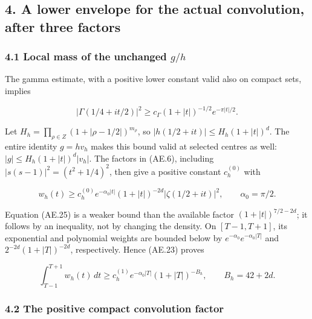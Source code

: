 \subsection*{4. A lower envelope for the actual convolution, after three
factors}
\label{AE.a-lower-envelope-for-the-actual-convolution-after-three-factors}

\subsubsection*{\texorpdfstring{4.1 Local mass of the unchanged
\(g/h\)}{4.1 Local mass of the unchanged g/h}}
\label{AE.local-mass-of-the-unchanged-gh}

The gamma estimate, with a positive lower constant valid also on compact
sets, implies

\[
 |\Gamma(1/4+it/2)|^2
 \ge c_\Gamma(1+|t|)^{-1/2}e^{-\pi|t|/2}.                              \tag{AE.24}\label{AE.eq.24}
\]

Let \(H_h=\prod_{\rho\in Z}(1+|\rho-1/2|)^{m_\rho}\), so
\(|h(1/2+it)|\le H_h(1+|t|)^d\). The entire identity \(g=hv_h\) makes
this bound valid at selected centres as well:
\(|g|\le H_h(1+|t|)^d|v_h|\). The factors in (AE.6), including
\(|s(s-1)|^2=(t^2+1/4)^2\), then give a positive constant \(c_h^{(0)}\)
with

\[
 w_h(t)\ge c_h^{(0)}e^{-\alpha_0|t|}(1+|t|)^{-2d}
                   |\zeta(1/2+it)|^2,\qquad \alpha_0=\pi/2.            \tag{AE.25}\label{AE.eq.25}
\]

Equation (AE.25) is a weaker bound than the available factor
\((1+|t|)^{7/2-2d}\); it follows by an inequality, not by changing the
density. On \([T-1,T+1]\), its exponential and polynomial weights are
bounded below by \(e^{-\alpha_0}e^{-\alpha_0|T|}\) and
\(2^{-2d}(1+|T|)^{-2d}\), respectively. Hence (AE.23) proves

\[
 \int_{T-1}^{T+1}w_h(t)\,dt
 \ge c_h^{(1)}e^{-\alpha_0|T|}(1+|T|)^{-B_h},\qquad B_h=42+2d.          \tag{AE.26}\label{AE.eq.26}
\]

\subsubsection*{4.2 The positive compact convolution
factor}
\label{AE.the-positive-compact-convolution-factor}

